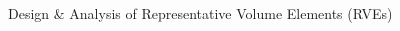 \documentclass[final]{beamer}
\begin{document}
\begin{frame}
\begin{center}
\begin{minipage}{\textwidth}
\begin{exampleblock}{\rule[-0.6ex]{0pt}{50pt}\centering\LARGE Design \& Analysis of Representative Volume Elements (RVEs)}
\begin{columns}
\begin{column}{0.2\textwidth}
\begin{center}
\begin{figure}[!h]
\end{figure}
     \end{center}
\end{column}
\end{columns}
\end{exampleblock}
\end{minipage}
\end{center}


\end{frame}
\end{document}
